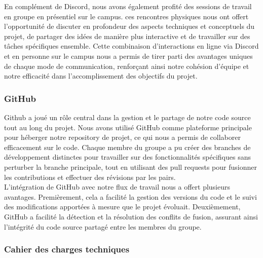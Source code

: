 En complément de Discord, nous avons également profité des sessions de travail en groupe en présentiel sur le campus. 
ces rencontres physiques nous ont offert l'opportunité de discuter en profondeur des aspects techniques et conceptuels du projet, de partager des idées de manière plus interactive et de travailler sur des tâches spécifiques ensemble. 
Cette combinaison d'interactions en ligne via Discord et en personne sur le campus nous a permis de tirer parti des avantages uniques de chaque mode de communication, renforçant ainsi notre cohésion d'équipe et notre efficacité dans l'accomplissement des objectifs du projet.
\\

\subsubsection{GitHub}

Github a joué un rôle central dans la gestion et le partage de notre code source tout au long du projet. 
Nous avons utilisé GitHub comme plateforme principale pour héberger notre repository de projet, ce qui nous a permis de collaborer efficacement sur le code. 
Chaque membre du groupe a pu créer des branches de développement distinctes pour travailler sur des fonctionnalités spécifiques sans perturber la branche principale, tout en utilisant des pull requests pour fusionner les contributions et effectuer des révisions par les pairs.
\\

L'intégration de GitHub avec notre flux de travail nous a offert plusieurs avantages. 
Premièrement, cela a facilité la gestion des versions du code et le suivi des modifications apportées à mesure que le projet évoluait. 
Deuxièmement, GitHub a facilité la détection et la résolution des conflits de fusion, assurant ainsi l'intégrité du code source partagé entre les membres du groupe. 
\\

\subsubsection{Cahier des charges techniques}